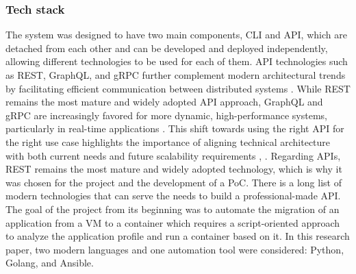 \documentclass[twocolumn]{article}
\begin{document}
\subsubsection{Tech stack}
The system was designed to have two main components, CLI and API, which are detached from each other and can be developed and deployed independently, allowing different technologies to be used for each of them. API technologies such as REST, GraphQL, and gRPC further complement modern architectural trends by facilitating efficient communication between distributed systems \cite{Ali-2024}. While REST remains the most mature and widely adopted API approach, GraphQL and gRPC are increasingly favored for more dynamic, high-performance systems, particularly in real-time applications \cite{Ali-2024}. This shift towards using the right API for the right use case highlights the importance of aligning technical architecture with both current needs and future scalability requirements \cite{Nivedhaa-2024}, \cite{Ali-2024}. Regarding APIs, REST remains the most mature and widely adopted technology, which is why it was chosen for the project and the development of a PoC. There is a long list of modern technologies that can serve the needs to build a professional-made API. The goal of the project from its beginning was to automate the migration of an application from a VM to a container which requires a script-oriented approach to analyze the application profile and run a container based on it. In this research paper, two modern languages and one automation tool were considered: Python, Golang, and Ansible. 
\end{document}
